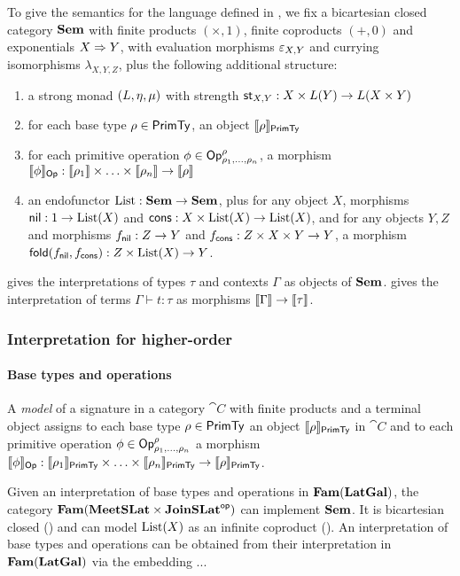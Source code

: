 To give the semantics for the language defined in , we fix a bicartesian closed
category $\mathbf{Sem}$ with finite products $(\times, 1)$, finite coproducts $(+, 0)$ and exponentials
$X \Rightarrow Y$, with evaluation morphisms $\varepsilon_{X,Y}$ and currying isomorphisms $\lambda_{X,Y,Z}$,
plus the following additional structure:
\begin{enumerate}
\item a strong monad $(L, \eta, \mu)$ with strength $\mathsf{st}_{X,Y}: X \times L(Y) \to L(X
\times Y)$
\item for each base type $\rho \in \mathsf{PrimTy}$, an object $\llbracket \rho \rrbracket_{\mathsf{PrimTy}}$
\item for each primitive operation $\phi \in \mathsf{Op}^\rho_{\rho_1,\ldots,\rho_n}$, a morphism
$\llbracket \phi \rrbracket_{\mathsf{Op}}: \llbracket \rho_1 \rrbracket \times \ldots \times \llbracket \rho_n \rrbracket \to \llbracket \rho \rrbracket$
\item an endofunctor $\mathrm{List}: \mathbf{Sem} \to \mathbf{Sem}$, plus for any object $X$, morphisms $\mathsf{nil}: 1 \to \mathrm{List}(X)$ and
$\mathsf{cons}: X \times \mathrm{List}(X) \to \mathrm{List}(X)$, and for any objects $Y, Z$ and morphisms $f_{\mathsf{nil}}: Z \to Y$ and
$f_{\mathsf{cons}}: Z \times X \times Y \to Y$, a morphism $\mathsf{fold}(f_{\mathsf{nil}},f_{\mathsf{cons}}): Z \times \mathrm{List}(X) \to Y$.
\end{enumerate}

 gives the interpretations of types $\tau$ and contexts $\Gamma$ as objects of $\mathbf{Sem}$.
 gives the interpretation of terms $\Gamma \vdash t: \tau$ as morphisms $\llbracket \Gamma \rrbracket
\to \llbracket \tau \rrbracket$.

\subsubsection{Interpretation for higher-order \GPS}

\paragraph{Base types and operations}
A \emph{model} of a signature in a category $\cat{C}$ with finite products and a terminal object assigns to
each base type $\rho \in \mathsf{PrimTy}$ an object $\llbracket \rho \rrbracket_{\mathsf{PrimTy}}$ in $\cat{C}$ and to each primitive
operation $\phi \in \mathsf{Op}^\rho_{\rho_1,\ldots,\rho_n}$ a morphism $\llbracket \phi \rrbracket_{\mathsf{Op}}: \llbracket \rho_1 \rrbracket_{\mathsf{PrimTy}}
\times \ldots \times \llbracket \rho_n \rrbracket_{\mathsf{PrimTy}} \to \llbracket \rho \rrbracket_{\mathsf{PrimTy}}$.

Given an interpretation of base types and operations in $\mathbf{Fam}(\mathbf{LatGal})$, the category $\mathbf{Fam}(\mathbf{MeetSLat} \times
\mathbf{JoinSLat}^{\mathsf{op}})$ can implement $\mathbf{Sem}$. It is bicartesian closed () and can model
$\mathrm{List}(X)$ as an infinite coproduct (). An interpretation
of base types and operations can be obtained from their interpretation in $\mathbf{Fam}(\mathbf{LatGal})$ via the embedding
...
